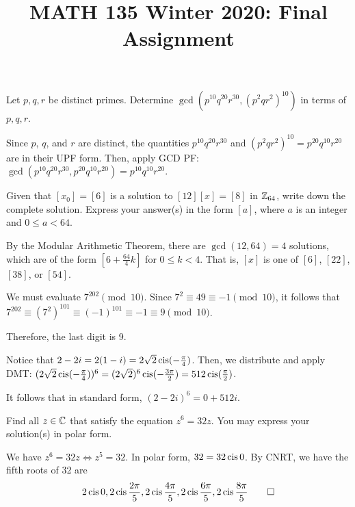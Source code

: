 \documentclass{agony}
\title{MATH 135 Winter 2020: Final Assignment}
\begin{document}
\thispagestyle{firstpage}
\textbf{\thetitle}

\begin{prob}
  Let $p,q,r$ be distinct primes.
  Determine $\gcd(p^{10}q^{20}r^{30},(p^2qr^2)^{10})$ in terms of $p,q,r$.
\end{prob}
\begin{sol}
  Since $p$, $q$, and $r$ are distinct, the quantities $p^{10}q^{20}r^{30}$
  and $(p^2qr^2)^{10} = p^{20}q^{10}r^{20}$ are in their UPF form.
  Then, apply GCD PF\@: $\gcd(p^{10}q^{20}r^{30},p^{20}q^{10}r^{20}) = p^{10}q^{10}r^{20}$.
\end{sol}

\begin{prob}
  Given that $[x_0] = [6]$ is a solution to $[12][x] = [8]$ in $\mathbb{Z}_{64}$, write down the complete solution.
  Express your answer(s) in the form $[a]$, where $a$ is an integer and $0 \leq a < 64$.
\end{prob}
\begin{sol}
  By the Modular Arithmetic Theorem, there are $\gcd(12,64) = 4$ solutions,
  which are of the form $[6+\frac{64}{4}k]$ for $0 \leq k < 4$.
  That is, $[x]$ is one of $[6]$, $[22]$, $[38]$, or $[54]$.
\end{sol}

\begin{sol}
  We must evaluate $7^{202} \pmod{10}$.
  Since $7^2 \equiv 49 \equiv -1 \pmod{10}$, it follows that $7^{202} \equiv (7^2)^{101} \equiv (-1)^{101} \equiv -1 \equiv 9 \pmod{10}$.

  Therefore, the last digit is 9.
\end{sol}

\begin{sol}
  Notice that $2-2i = 2(1-i) = 2\sqrt{2}\operatorname{cis}(-\frac\pi4)$.
  Then, we distribute and apply DMT\@: $(2\sqrt{2}\operatorname{cis}(-\frac\pi4))^6 = (2\sqrt{2})^6\operatorname{cis}(-\frac{3\pi}{2}) = 512\operatorname{cis}(\frac{\pi}{2})$.

  It follows that in standard form, $(2-2i)^6 = 0 + 512i$.
\end{sol}

\begin{prob}
  Find all $z\in\mathbb{C}$ that satisfy the equation $z^6 = 32z$.
  You may express your solution(s) in polar form.
\end{prob}
\begin{sol}
  We have $z^6 = 32z \iff z^5 = 32$.
  In polar form, $32 = 32 \operatorname{cis} 0$.
  By CNRT, we have the fifth roots of 32 are
  \[ 2\operatorname{cis} 0, 2\operatorname{cis}\frac{2\pi}{5}, 2\operatorname{cis}\frac{4\pi}{5}, 2\operatorname{cis}\frac{6\pi}{5}, 2\operatorname{cis}\frac{8\pi}{5} \qedhere \]
\end{sol}
\end{document}
